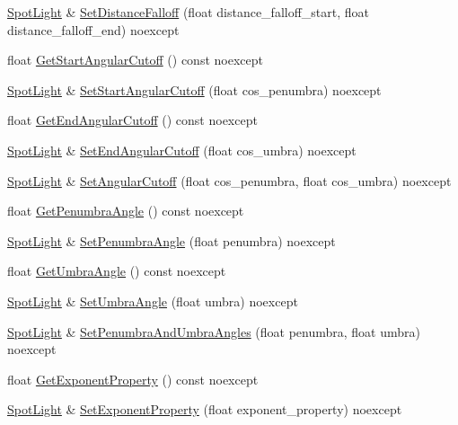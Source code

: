 \begin{DoxyCompactItemize}
\item 
\hyperlink{classmage_1_1_spot_light}{Spot\+Light} \& \hyperlink{classmage_1_1_spot_light_aba581f1c85806247640070b97dff3d6c}{Set\+Distance\+Falloff} (float distance\+\_\+falloff\+\_\+start, float distance\+\_\+falloff\+\_\+end) noexcept
\item 
float \hyperlink{classmage_1_1_spot_light_ae221dd2747e65d01fcbf2a9b08c54abd}{Get\+Start\+Angular\+Cutoff} () const noexcept
\item 
\hyperlink{classmage_1_1_spot_light}{Spot\+Light} \& \hyperlink{classmage_1_1_spot_light_a3129a3c330cf63066497af087f97476b}{Set\+Start\+Angular\+Cutoff} (float cos\+\_\+penumbra) noexcept
\item 
float \hyperlink{classmage_1_1_spot_light_a9e1ec369a3f42a4662c4cde2aa4a9ac4}{Get\+End\+Angular\+Cutoff} () const noexcept
\item 
\hyperlink{classmage_1_1_spot_light}{Spot\+Light} \& \hyperlink{classmage_1_1_spot_light_af176ade9e4617b9ef0bec54cf96be975}{Set\+End\+Angular\+Cutoff} (float cos\+\_\+umbra) noexcept
\item 
\hyperlink{classmage_1_1_spot_light}{Spot\+Light} \& \hyperlink{classmage_1_1_spot_light_a16aed8994d930f2c4aa49da6b3929d55}{Set\+Angular\+Cutoff} (float cos\+\_\+penumbra, float cos\+\_\+umbra) noexcept
\item 
float \hyperlink{classmage_1_1_spot_light_a041dfc4fd7729d8d954f19af9debb3d1}{Get\+Penumbra\+Angle} () const noexcept
\item 
\hyperlink{classmage_1_1_spot_light}{Spot\+Light} \& \hyperlink{classmage_1_1_spot_light_ae3c5ce99c98e6e9c06b22e372ed22220}{Set\+Penumbra\+Angle} (float penumbra) noexcept
\item 
float \hyperlink{classmage_1_1_spot_light_a61d921afd94fbbf040cdb697d89c1a94}{Get\+Umbra\+Angle} () const noexcept
\item 
\hyperlink{classmage_1_1_spot_light}{Spot\+Light} \& \hyperlink{classmage_1_1_spot_light_a2ed52e8084bda7caffdc8c8e19ee2193}{Set\+Umbra\+Angle} (float umbra) noexcept
\item 
\hyperlink{classmage_1_1_spot_light}{Spot\+Light} \& \hyperlink{classmage_1_1_spot_light_ac44958561c2f75e04c938546a961ed48}{Set\+Penumbra\+And\+Umbra\+Angles} (float penumbra, float umbra) noexcept
\item 
float \hyperlink{classmage_1_1_spot_light_a0e92cc6201e2b9c8b2eb06c50a53ae13}{Get\+Exponent\+Property} () const noexcept
\item 
\hyperlink{classmage_1_1_spot_light}{Spot\+Light} \& \hyperlink{classmage_1_1_spot_light_abdde33958e6d2ce38c41f7624c3ab265}{Set\+Exponent\+Property} (float exponent\+\_\+property) noexcept
\end{DoxyCompactItemize}
